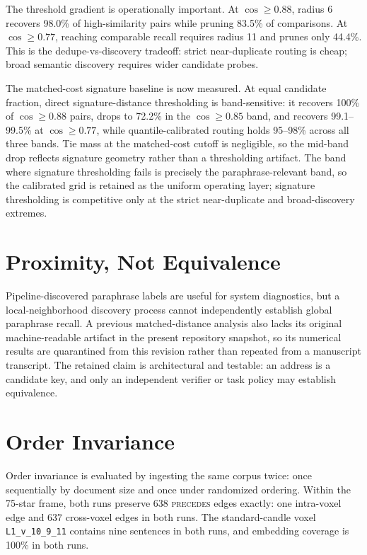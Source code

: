 \documentclass[11pt]{article}
\begin{document}
The threshold gradient is operationally important. At $\cos\geq0.88$, radius 6 recovers 98.0\% of high-similarity pairs while pruning 83.5\% of comparisons. At $\cos\geq0.77$, reaching comparable recall requires radius 11 and prunes only 44.4\%. This is the dedupe-vs-discovery tradeoff: strict near-duplicate routing is cheap; broad semantic discovery requires wider candidate probes.

The matched-cost signature baseline is now measured. At equal candidate fraction, direct signature-distance thresholding is band-sensitive: it recovers 100\% of $\cos\geq0.88$ pairs, drops to 72.2\% in the $\cos\geq0.85$ band, and recovers 99.1--99.5\% at $\cos\geq0.77$, while quantile-calibrated routing holds 95--98\% across all three bands. Tie mass at the matched-cost cutoff is negligible, so the mid-band drop reflects signature geometry rather than a thresholding artifact. The band where signature thresholding fails is precisely the paraphrase-relevant band, so the calibrated grid is retained as the uniform operating layer; signature thresholding is competitive only at the strict near-duplicate and broad-discovery extremes.

\section{Proximity, Not Equivalence}
\label{sec:negative-paraphrase}

Pipeline-discovered paraphrase labels are useful for system diagnostics, but a local-neighborhood discovery process cannot independently establish global paraphrase recall. A previous matched-distance analysis also lacks its original machine-readable artifact in the present repository snapshot, so its numerical results are quarantined from this revision rather than repeated from a manuscript transcript. The retained claim is architectural and testable: an address is a candidate key, and only an independent verifier or task policy may establish equivalence.

\section{Order Invariance}
\label{sec:order-invariance}

Order invariance is evaluated by ingesting the same corpus twice: once sequentially by document size and once under randomized ordering. Within the 75-star frame, both runs preserve 638 \textsc{precedes} edges exactly: one intra-voxel edge and 637 cross-voxel edges in both runs. The standard-candle voxel \texttt{L1\_v\_10\_9\_11} contains nine sentences in both runs, and embedding coverage is 100\% in both runs.
\end{document}
